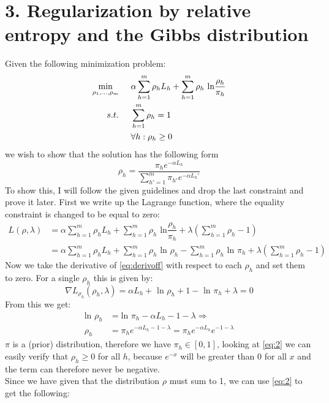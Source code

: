 \documentclass{article}
\begin{document}
\section{3. Regularization by relative entropy and the Gibbs distribution}
Given the following minimization problem:
\begin{align}
\label{eq:ogprob}
\min_{\rho_1,...,\rho_m} \hspace{0.5cm} &\alpha \sum\limits_{h=1}^m \rho_h L_h + \sum\limits_{h=1}^m \rho_h \text{ ln} \dfrac{\rho_h}{\pi_h} \\
s.t. \hspace{0.5cm} &\sum\limits_{h=1}^m \rho_h = 1 \\
&\forall h: \rho_h \geq 0
\end{align}
we wish to show that the solution has the following form
\begin{equation}
\label{eq:2showthis}
\rho_h = \dfrac{\pi_h e^{-\alpha L_h}}{\sum_{h'=1}^m \pi_{h'}e^{-\alpha L_h'}}
\end{equation}
To show this, I will follow the given guidelines and drop the last constraint and prove it later. First we write up the Lagrange function, where the equality constraint is changed to be equal to zero:
\begin{align}
L(\rho, \lambda) &= \alpha \sum\limits_{h=1}^m \rho_h L_h + \sum\limits_{h=1}^m \rho_h \text{ ln} \dfrac{\rho_h}{\pi_h} + \lambda(\sum\limits_{h=1}^m \rho_h -1) \\
&= \alpha \sum\limits_{h=1}^m \rho_h L_h + \sum\limits_{h=1}^m \rho_h 
\text{ ln } \rho_h - \sum\limits_{h=1}^m \rho_h \text{ ln } \pi_h + \lambda(\sum\limits_{h=1}^m \rho_h -1)
\label{eq:derivoff}
\end{align}
Now we take the derivative of \eqref{eq:derivoff} with respect to  each $\rho_h$ and set them to zero. For a single $\rho_h$ this is given by:
\begin{equation}
\nabla L_{\rho_h} (\rho_h, \lambda) = \alpha L_h + \text{ ln } \rho_h + 1 - \text{ ln } \pi_h + \lambda = 0
\end{equation}
From this we get:
\begin{align}
\text{ln } \rho_h &= \text{ln } \pi_h - \alpha L_h -1 - \lambda \Rightarrow \\
\rho_h &= \pi_h e^{-\alpha L_h -1 - \lambda} = \pi_h e^{-\alpha L_h} e^{-1-\lambda}
\label{eq:2}
\end{align}
$\pi$ is a (prior) distribution, therefore we have $\pi_h \in [0,1]$, looking at \eqref{eq:2} we can easily verify that $\rho_h \geq 0$ for all $h$, because $e^{-x}$ will be greater than 0 for all $x$ and the term can therefore never be negative. \\ Since we have given that the distribution $\rho$ must sum to 1, we can use \eqref{eq:2} to get the following:
\end{document}
